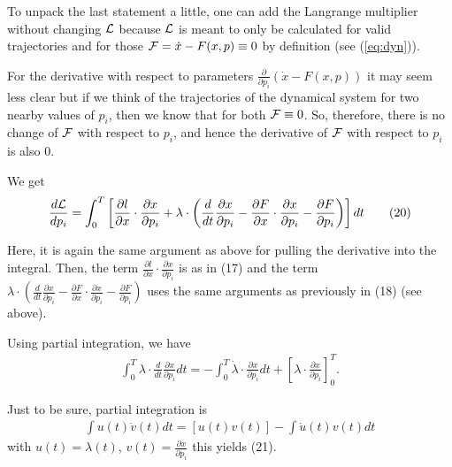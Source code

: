 \documentclass[a4paper]{article}
\newcommand{\blue}[1]{{\color{blue}#1}}
\begin{document}
To unpack the last statement a little, one can add the Langrange
multiplier without 
changing $\cal L$ because $\cal L$ is meant to only be calculated for
valid trajectories and for those ${\cal F}= \dot{x} - F(x,p) \equiv 0$ by
definition (see \blue{(\ref{eq:dyn})}).

For the derivative with respect to parameters
$\frac{\partial}{\partial p_i} \left(\dot{x} - F(x,p)\right)$ it may seem less
clear but if we think of the trajectories of the dynamical system for
two nearby values of $p_i$, then we know that for both ${\cal F}
\equiv 0$. So, therefore, there is no change of $\cal F$ with respect
to $p_i$, and hence the derivative of $\cal F$ with respect to $p_i$
is also $0$.

\blue{We
  get
  \begin{align}
    \frac{d \cal L}{d p_i} = \int_0^T \left[
      \frac{\partial l}{\partial x}\cdot \frac{\partial x}{\partial
        p_i} + \lambda \cdot \left(\frac{d}{dt}\frac{\partial
        x}{\partial p_i} - \frac{\partial F}{\partial x}\cdot
      \frac{\partial x}{\partial p_i} - \frac{\partial F}{\partial
        p_i}\right) \right] dt \tag{20}
  \end{align}
  }

Here, it is again the same argument as above for pulling the
derivative into the integral. Then, the term $\frac{\partial
  l}{\partial x}\cdot \frac{\partial x}{\partial p_i}$ is as in
\blue{(17)} and the term $\lambda \cdot \left(\frac{d}{dt}\frac{\partial
  x}{\partial p_i} - \frac{\partial F}{\partial x}\cdot
\frac{\partial x}{\partial p_i} - \frac{\partial F}{\partial
  p_i}\right)$ uses the same arguments as previously in
\blue{(18)} (see above).

\blue{Using partial integration, we have
  \begin{align}
    \int_0^T \lambda \cdot \frac{d}{dt} \frac{\partial x}{\partial
      p_i} dt = - \int_0^T \dot{\lambda} \cdot \frac{\partial x}
    {\partial p_i} dt +\left[\lambda \cdot \frac{\partial x}{\partial
        p_i} \right]^T_0 . \tag{21}
  \end{align}
  
}

Just to be sure, partial integration is
\begin{align}
  \int u(t) \dot{v}(t) dt = \left[ u(t) v(t) \right] - \int \dot{u}(t) v(t)
  dt
\end{align}
with $u(t) = \lambda (t)$, $v(t) = \frac{\partial x}{\partial p_i}$
this yields \blue{(21)}.
\end{document}
